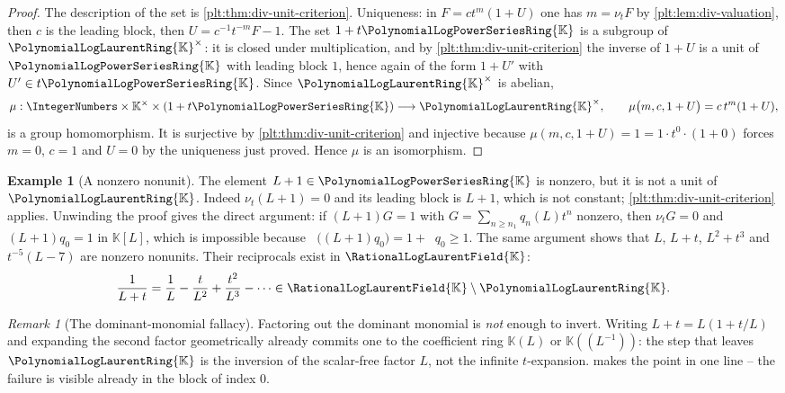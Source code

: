 \documentclass[11pt,oneside]{article}
\theoremstyle{plain}
\theoremstyle{definition}
\newtheorem{example}[theorem]{Example}
\theoremstyle{remark}
\newtheorem{remark}[theorem]{Remark}
\newcommand{\K}{\mathbb{K}}
\newcommand{\PLpow}{\PolynomialLogPowerSeriesRing{\K}}   %
\newcommand{\PLlau}{\PolynomialLogLaurentRing{\K}}       %
\newcommand{\PLrat}{\RationalLogLaurentField{\K}}        %
\newcommand{\ordt}{\nu_{t}}                              %
\DeclareMathOperator{\degL}{deg_{L}}
\begin{document}
\begin{proof}
The description of the set is \cref{plt:thm:div-unit-criterion}.  Uniqueness:
in \(F=ct^{m}(1+U)\) one has \(m=\ordt F\) by
\cref{plt:lem:div-valuation}, then \(c\) is the leading block, then
\(U=c^{-1}t^{-m}F-1\).
The set \(1+t\PLpow\) is a subgroup of \(\PLlau^{\times}\): it is closed under
multiplication, and by \cref{plt:thm:div-unit-criterion} the inverse of
\(1+U\) is a unit of \(\PLpow\) with leading block \(1\), hence again of the
form \(1+U'\) with \(U'\in t\PLpow\).  Since \(\PLlau^{\times}\) is abelian,
\[
  \mu:\IntegerNumbers\times\K^{\times}\times(1+t\PLpow)
  \longrightarrow\PLlau^{\times},
  \qquad
  \mu\bigl(m,c,1+U\bigr)=c\,t^{m}(1+U),
\]
is a group homomorphism.  It is surjective by
\cref{plt:thm:div-unit-criterion} and injective because
\(\mu(m,c,1+U)=1=1\cdot t^{0}\cdot(1+0)\) forces \(m=0\), \(c=1\) and \(U=0\)
by the uniqueness just proved.  Hence \(\mu\) is an isomorphism.
\end{proof}

\begin{example}[A nonzero nonunit]\label{plt:ex:div-nonunit}
The element \(L+1\in\PLpow\) is nonzero, but it is not a unit of \(\PLlau\).
Indeed \(\ordt(L+1)=0\) and its leading block is \(L+1\), which is not
constant; \cref{plt:thm:div-unit-criterion} applies.  Unwinding the proof gives
the direct argument: if \((L+1)G=1\) with \(G=\sum_{n\ge n_{1}}q_{n}(L)t^{n}\)
nonzero, then \(\ordt G=0\) and \((L+1)q_{0}=1\) in \(\K[L]\), which is
impossible because \(\degL\bigl((L+1)q_{0}\bigr)=1+\degL q_{0}\ge1\).  The
same argument shows that \(L\), \(L+t\), \(L^{2}+t^{3}\) and
\(t^{-5}(L-7)\) are nonzero nonunits.  Their reciprocals exist in \(\PLrat\):
\begin{equation}\label{plt:eq:div-Lplust}
  \frac{1}{L+t}
  =\frac1L-\frac{t}{L^{2}}+\frac{t^{2}}{L^{3}}-\cdots
  \in\PLrat\setminus\PLlau .
\end{equation}
\end{example}

\begin{remark}[The dominant-monomial fallacy]\label{plt:rmk:div-dominant}
Factoring out the dominant monomial is \emph{not} enough to invert.  Writing
\(L+t=L(1+t/L)\) and expanding the second factor geometrically already commits
one to the coefficient ring \(\K(L)\) or \(\K((L^{-1}))\): the step that leaves
\(\PLlau\) is the inversion of the scalar-free factor \(L\), not the infinite
\(t\)-expansion.   makes the point in one line -- the
failure is visible already in the block of index \(0\).
\end{remark}
\end{document}
